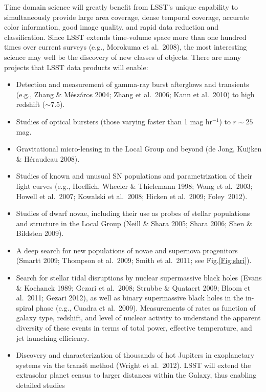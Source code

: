 \documentclass{emulateapj}
\begin{document}
Time domain science will greatly benefit from LSST's unique capability to simultaneously
provide large area coverage, dense temporal coverage, accurate color information,
good image quality, and rapid data reduction and classification. Since LSST extends 
time-volume space more than one hundred times over current surveys (e.g., Morokuma et al.~2008), 
the most interesting science may well be the discovery of new classes of objects.  
There are many projects that LSST data products will enable:

\begin{itemize}
\item Detection and measurement of gamma-ray burst afterglows and transients 
      (e.g., Zhang \& M\'{e}sz\'{a}ros 2004; Zhang et al.~2006; Kann et al.~2010) to high redshift ($\sim$7.5).
  \item Studies of optical bursters (those varying faster than 1 mag hr$^{-1}$) to $r\sim25$ mag. 
\item Gravitational micro-lensing in the Local Group and beyond (de Jong, Kuijken \& H\'{e}raudeau 2008).
\item Studies of known and unusual SN populations and parametrization of their light curves 
         (e.g., Hoeflich, Wheeler \& Thielemann 1998; Wang et al.~2003; Howell et al.~2007;
          Kowalski et al.~2008; Hicken et al.~2009; Foley~2012).
\item Studies of dwarf novae, including their use as probes of stellar populations and 
      structure in the Local Group (Neill \& Shara 2005; Shara 2006; Shen \& Bildsten 2009).
\item A deep search for new populations of novae and supernova progenitors 
      (Smartt 2009; Thompson et al.~2009; Smith et al.~2011; see Fig.\ref{Fig:shri}). 
\item Search for stellar tidal disruptions by nuclear supermassive black
       holes (Evans \& Kochanek 1989; Gezari et al.~2008; Strubbe \& Quataert 2009; Bloom et al.~2011; Gezari 2012), 
       as well as binary supermassive black holes in the in-spiral phase (e.g., Cuadra et al.~2009).
       Measurements of rates as function of galaxy type, redshift, and level of nuclear activity
       to understand the apparent diversity of these events in terms of  total power, effective temperature, 
       and jet launching efficiency. 
\item Discovery and characterization of thousands of hot Jupiters 
  in exoplanetary systems via the transit method (Wright et al.~2012). 
LSST will extend the extrasolar planet census to larger distances within the Galaxy, thus enabling detailed studies 

\end{itemize}
\end{document}
